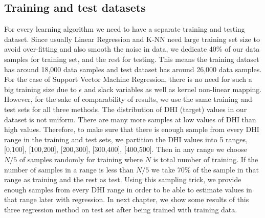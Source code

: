 \subsection{Training and test datasets}
For every learning algorithm we need to have a separate training and testing dataset. Since usually Linear Regression and K-NN need large training set size to avoid over-fitting and also smooth the noise in data, we dedicate 40\% of our data samples for training set, and the rest for testing. This means the training dataset has around 18,000 data samples and test dataset has around 26,000 data samples. For the case of Support Vector Machine Regression, there is no need for such a big training size due to $\epsilon$ and slack variables as well as kernel non-linear mapping. However, for the sake of comparability of results, we use the same training and test sets for all three methods. The distribution of DHI (target) values in our dataset is not uniform. There are many more samples at low values of DHI than high values. Therefore, to make sure that there is enough sample from every DHI range in the training and test sets, we partition the DHI values into 5 ranges, [0,100], [100,200], [200,300], [300,400], [400,500]. Then in any range we choose $N/5$ of samples randomly for training where $N$ is total number of training. If the number of samples in a range is less than $N/5$ we take 70\% of the sample in that range as training and the rest as test. Using this sampling trick, we provide enough samples from every DHI range in order to be able to estimate values in that range later with regression. In next chapter, we show some results of this three regression method on test set after being trained with training data.


